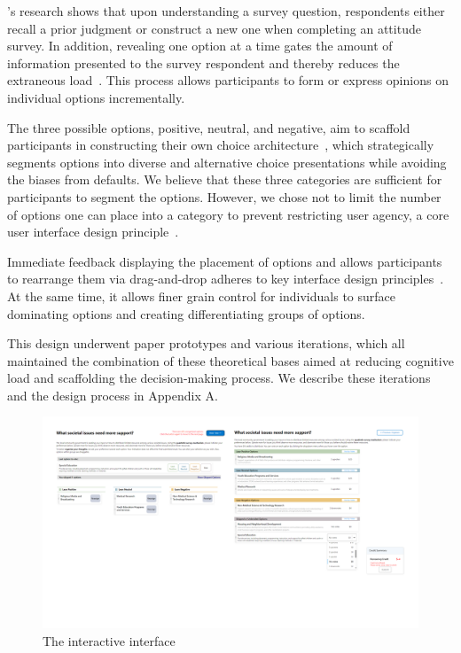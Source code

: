 \textcite{strackThinkingJudgingCommunicating1987}'s research shows that upon understanding a survey question, respondents either recall a prior judgment or construct a new one when completing an attitude survey. In addition, revealing one option at a time gates the amount of information presented to the survey respondent and thereby reduces the extraneous load~\cite{swellerCognitiveLoadTheory2011}. This process allows participants to form or express opinions on individual options incrementally.

The three possible options, positive, neutral, and negative, aim to scaffold participants in constructing their own choice architecture~\cite{munscherReviewTaxonomyChoice2016, thalerNudgeImprovingDecisions2008a}, which strategically segments options into diverse and alternative choice presentations while avoiding the biases from defaults. We believe that these three categories are sufficient for participants to segment the options. However, we chose not to limit the number of options one can place into a category to prevent restricting user agency, a core user interface design principle~\cite{norman2013design}.

Immediate feedback displaying the placement of options and allows participants to rearrange them via drag-and-drop adheres to key interface design principles~\cite{norman2013design}. At the same time, it allows finer grain control for individuals to surface dominating options and creating differentiating groups of options.

This design underwent paper prototypes and various iterations, which all maintained the combination of these theoretical bases aimed at reducing cognitive load and scaffolding the decision-making process. We describe these iterations and the design process in Appendix A.
\begin{figure}[ht]
    \centering
    \includegraphics[width=1\textwidth]{content/image/interface.png}
    \caption{The interactive interface}
    \label{fig:interactiveInterface}
\end{figure}

